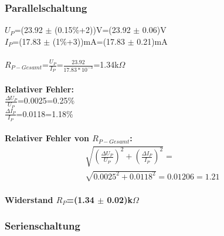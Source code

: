 \documentclass{article}
\begin{document}
\subsubsection*{Parallelschaltung}
$U_P$=(23.92 $\pm$ (0.15\%+2))V=(23.92 $\pm$ 0.06)V\\
$I_P$=(17.83 $\pm$ (1\%+3))mA=(17.83 $\pm$ 0.21)mA\\
\\
$R_{P-Gesamt}$=$\frac{U_P}{I_P}$=$\frac{23.92}{17.83*10^{-3}}$=1.34k$\Omega$\\
\\
\textbf{Relativer Fehler:}\\
$\frac{\Delta U_P}{U_P}$=0.0025=0.25\%\\
$\frac{\Delta I_P}{I_P}$=0.0118=1.18\%\\
\\
\textbf{Relativer Fehler von $R_{P-Gesamt}$:}\\
\begin{gather}
\sqrt{(\frac{\Delta U_P}{U_P})^2+(\frac{\Delta I_P}{I_P})^2 }=\\
\sqrt{0.0025^2+0.0118^2}=0.01206=1.21%
\end{gather} \\
\textbf{Widerstand $R_P$=(1.34 $\pm$ 0.02)k$\Omega$}\\

\subsubsection*{Serienschaltung}
\end{document}
